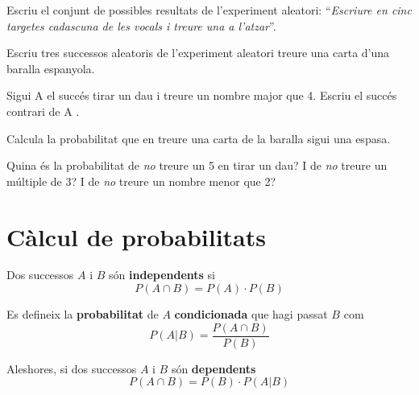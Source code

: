 \begin{mylist}
	\item
	Escriu el conjunt de possibles resultats de l'experiment aleatori:
	``\emph{Escriure en cinc targetes cadascuna de les vocals i treure una
		a l'atzar}''.
	\item
	Escriu tres successos aleatoris de l'experiment aleatori treure una
	carta d'una baralla espanyola. 
	\item
	Sigui A el succés tirar un dau i treure un nombre major que 4. Escriu
	el succés contrari de A .
	\item
	Calcula la probabilitat que en treure una carta de la baralla sigui
	una espasa.
	\item
	Quina és la probabilitat de \emph{no} treure un 5 en tirar un dau? I
	de \emph{no} treure un múltiple de 3? I de \emph{no} treure un nombre
	menor que 2? 
\end{mylist}

\section{Càlcul de probabilitats}

\begin{theorybox}
	Dos successos $A$ i $B$ són \textbf{independents} si
	\begin{equation*}
	P(A \cap B) = P(A)\cdot P(B)
	\end{equation*}
	
	
	Es defineix la \textbf{probabilitat} de $A$ \textbf{condicionada} que hagi passat $B$ com
	\begin{equation*}
	P(A | B) = \frac{P(A\cap B)}{ P(B)}
	\end{equation*}
	
	Aleshores, si dos successos $A$ i $B$ són \textbf{dependents}
	\begin{equation*}
	P(A \cap B) = P(B)\cdot P(A | B)
	\end{equation*}
	
\end{theorybox}
 

